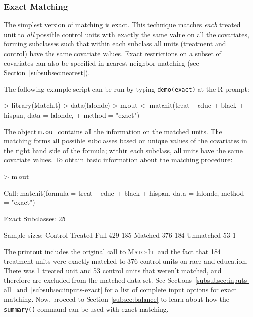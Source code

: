 \documentclass[oneside,letterpaper,titlepage]{article}
\newcommand{\MatchIt}{\textsc{MatchIt}}
\begin{document}
\subsubsection{Exact Matching}
\label{subsubsec:exact}

The simplest version of matching is exact.  This technique matches
\emph{each} treated unit to \emph{all} possible control units with
exactly the same value on all the covariates, forming subclasses such
that within each subclass all units (treatment and control) have the
same covariate values.  Exact restrictions on a subset of covariates
can also be specified in nearest neighbor matching (see
Section~\ref{subsubsec:nearest}).

The following example script can be run by typing {\tt demo(exact)} at
the R prompt:

\begin{Schunk}
\begin{Sinput}
> library(MatchIt)
> data(lalonde)
> m.out <- matchit(treat ~ educ + black + hispan, data = lalonde, 
+     method = "exact")
\end{Sinput}
\end{Schunk}

The object \texttt{m.out} contains all the information on the matched
units.  The matching forms all possible subclasses based on unique
values of the covariates in the right hand side of the formula; within
each subclass, all units have the same covariate values.  To obtain
basic information about the matching procedure:

\begin{Schunk}
\begin{Sinput}
> m.out
\end{Sinput}
\begin{Soutput}

Call: matchit(formula = treat ~ educ + black + hispan, data = lalonde,     method = "exact")

Exact Subclasses: 25

Sample sizes:
          Control Treated
Full          429     185
Matched       376     184
Unmatched      53       1


\end{Soutput}
\end{Schunk}

The printout includes the original call to \MatchIt\ and the fact that
184
treatment units were exactly matched to 376 
control units on race
and education. There was 1
treated unit and 53
control units that weren't matched,
and therefore are excluded from the matched data set. See
Sections~\ref{subsubsec:inputs-all}~and~\ref{subsubsec:inputs-exact}
for a list of complete input options for exact matching.  Now, proceed
to Section~\ref{subsec:balance} to learn about how the {\tt summary()}
command can be used with exact matching.
\end{document}
